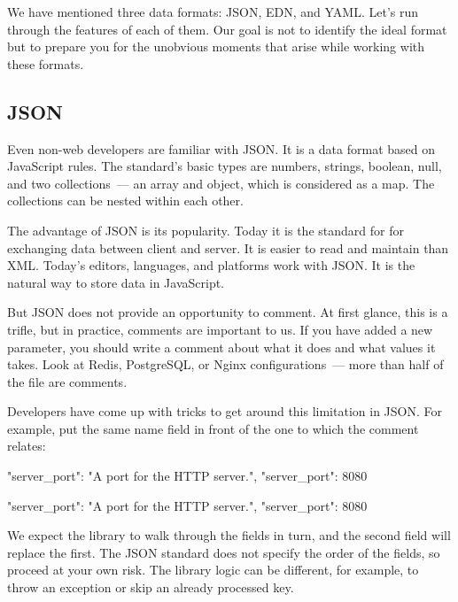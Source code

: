 We have mentioned three data formats: JSON, EDN, and YAML. Let's run through the features of each of them.  Our goal is not to identify the ideal format but to prepare you for the unobvious moments that arise while working with these formats.

\subsection{JSON}


Even non-web developers are familiar with JSON. It is a data format based on JavaScript rules. The standard's basic types are numbers, strings, boolean, null, and two collections~--- an array and object, which is considered as a map. The collections can be nested within each other.


The advantage of JSON is its popularity. Today it is the standard for for exchanging data between client and server.  It is easier to read and maintain than XML. Today's editors, languages, and platforms work with JSON. It is the natural way to store data in JavaScript.

But JSON does not provide an opportunity to comment. At first glance, this is a trifle, but in practice, comments are important to us. If you have added a new parameter, you should write a comment about what it does and what values it takes. Look at Redis, PostgreSQL, or Nginx configurations~--- more than half of the file are comments.

Developers have come up with tricks to get around this limitation in JSON.  For example, put the same name field in front of the one to which the comment relates:

\ifnarrow

\begin{json}
{
    "server_port":
    "A port for the HTTP server.",
    "server_port": 8080
}
\end{json}

\else

\begin{json}
{
    "server_port": "A port for the HTTP server.",
    "server_port": 8080
}
\end{json}

\fi

We expect the library to walk through the fields in turn, and the second field will replace the first. The JSON standard does not specify the order of the fields, so proceed at your own risk. The library logic can be different, for example, to throw an exception or skip an already processed key.

